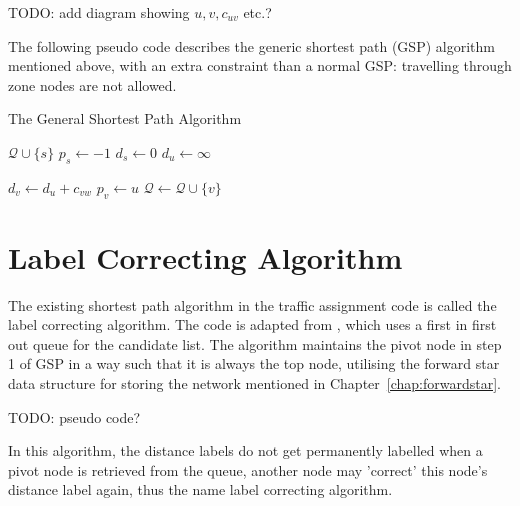 {
    TODO:
    add diagram showing $u, v, c_{uv}$ etc.?
}

The following pseudo code describes the generic shortest path (GSP) algorithm mentioned above,
with an extra constraint than a normal GSP: travelling through zone nodes are not allowed.
\begin{algorithm}
    \caption{The General Shortest Path Algorithm \citep{Klunder}}
    \begin{algorithmic}[1]
        \State $\mathcal{Q} \cup \{s\}$ 
        \State $p_s \gets -1$
        \State $d_s \gets 0$
         
            \State $d_u \gets \infty$
        \EndFor

             
                        \State $d_v \gets d_u + c_{vw}$
                        \State $p_v \gets u$
                         
                        \State $\mathcal{Q} \gets \mathcal{Q} \cup \{v\}$
                        \EndIf
                    \EndIf
                \EndFor
            \EndIf
        \EndWhile
        \EndProcedure
    \end{algorithmic}
\end{algorithm}


\section{Label Correcting Algorithm}
\label{section:labelcorrectingalgorithm}
The existing shortest path algorithm in the traffic assignment code is called the label correcting algorithm.
The code is adapted from \citep{Sheffi}, 
which uses a first in first out queue for the candidate list.
The algorithm maintains the pivot node in step 1 of GSP in a way such that it is always the top node,
utilising the forward star data structure for storing the network mentioned in Chapter~\ref{chap:forwardstar}.

{
    TODO: pseudo code?
}

In this algorithm,
the distance labels do not get permanently labelled when a pivot node is retrieved from the queue,
another node may 'correct' this node's distance label again,
thus the name label correcting algorithm.


